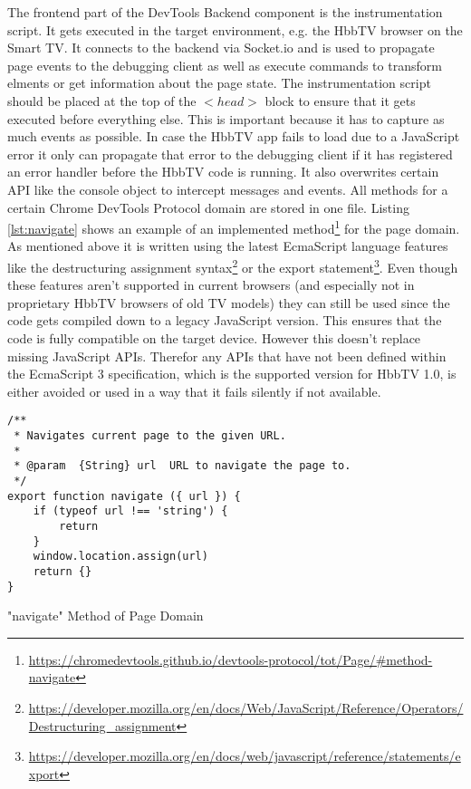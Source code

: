 The frontend part of the DevTools Backend component is the instrumentation script. It gets executed
in the target environment, e.g. the HbbTV browser on the Smart TV. It connects to the backend via
Socket.io and is used to propagate page events to the debugging client as well as execute commands
to transform elments or get information about the page state. The instrumentation script should be
placed at the top of the \textit{$<head>$} block to ensure that it gets executed before everything
else. This is important because it has to capture as much events as possible. In case the HbbTV app
fails to load due to a JavaScript error it only can propagate that error to the debugging client if
it has registered an error handler before the HbbTV code is running. It also overwrites certain API
like the console object to intercept messages and events. All methods for a certain Chrome DevTools
Protocol domain are stored in one file. Listing \ref{lst:navigate} shows an example of an implemented
method\footnote{\url{https://chromedevtools.github.io/devtools-protocol/tot/Page/\#method-navigate}}
for the page domain. As mentioned above it is written using the latest EcmaScript language features
like the destructuring assignment syntax\footnote{\url{https://developer.mozilla.org/en/docs/Web/JavaScript/Reference/Operators/Destructuring_assignment}}
or the export statement\footnote{\url{https://developer.mozilla.org/en/docs/web/javascript/reference/statements/export}}.
Even though these features aren't supported in current browsers (and especially not in proprietary
HbbTV browsers of old TV models) they can still be used since the code gets compiled down to a legacy
JavaScript version. This ensures that the code is fully compatible on the target device. However this
doesn't replace missing JavaScript APIs. Therefor any APIs that have not been defined within the
EcmaScript 3 specification, which is the supported version for HbbTV 1.0, is either avoided or used
in a way that it fails silently if not available.

\begin{listing}[H]
\begin{verbatim}
/**
 * Navigates current page to the given URL.
 *
 * @param  {String} url  URL to navigate the page to.
 */
export function navigate ({ url }) {
    if (typeof url !== 'string') {
        return
    }
    window.location.assign(url)
    return {}
}
\end{verbatim}
\caption{"navigate" Method of Page Domain}
\label{lst:navigate}
\end{listing}

